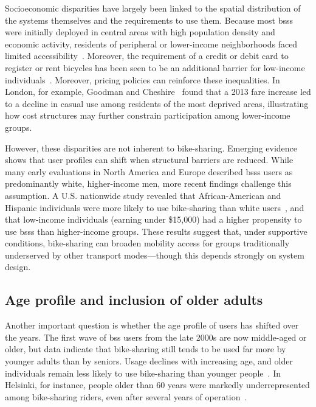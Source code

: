     Socioeconomic disparities have largely been linked to the spatial distribution of the systems themselves and the requirements to use them. Because most \acp{bss} were initially deployed in central areas with high population density and economic activity, residents of peripheral or lower-income neighborhoods faced limited accessibility~\cite{Ogilvie2012, Goodman2014, Willberg2021}. Moreover, the requirement of a credit or debit card to register or rent bicycles has been seen to be an additional barrier for low-income individuals~\cite{Ricci2015, Ogilvie2012}. Moreover, pricing policies can reinforce these inequalities. In London, for example, Goodman and Cheshire~\cite{Goodman2014} found that a 2013 fare increase led to a decline in casual use among residents of the most deprived areas, illustrating how cost structures may further constrain participation among lower-income groups.

    However, these disparities are not inherent to bike-sharing. Emerging evidence shows that user profiles can shift when structural barriers are reduced. While many early evaluations in North America and Europe described \acp{bss} users as predominantly white, higher-income men, more recent findings challenge this assumption. A U.S. nationwide study revealed that African-American and Hispanic individuals were more likely to use bike-sharing than white users~\cite{Yu2024}, and that low-income individuals (earning under \$15,000) had a higher propensity to use \acp{bss} than higher-income groups. These results suggest that, under supportive conditions, bike-sharing can broaden mobility access for groups traditionally underserved by other transport modes—though this depends strongly on system design.

    \subsection{Age profile and inclusion of older adults}

    Another important question is whether the age profile of users has shifted over the years. The first wave of \ac{bss} users from the late 2000s are now middle-aged or older, but data indicate that bike-sharing still tends to be used far more by younger adults than by seniors. Usage declines with increasing age, and older individuals remain less likely to use bike-sharing than younger people~\cite{Yu2024}. In Helsinki, for instance, people older than 60 years were markedly underrepresented among bike-sharing riders, even after several years of operation~\cite{Willberg2021}. 

